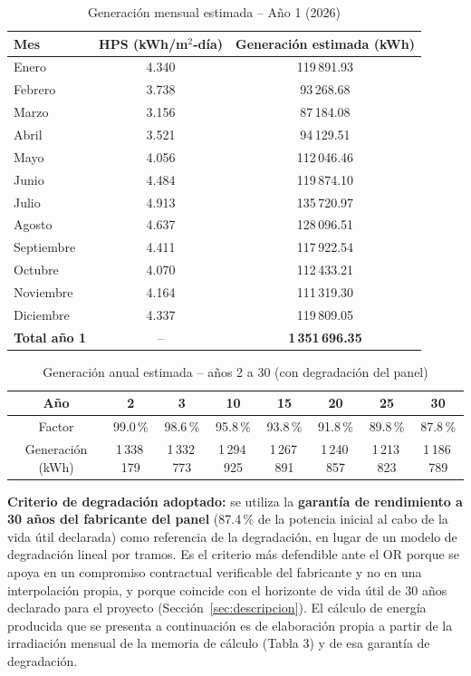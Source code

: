 \documentclass[11pt,a4paper]{article}
\begin{document}
\begin{table}[H]
\centering
\caption{Generaci\'on mensual estimada -- A\~no 1 (2026)}
\begin{tabular}{lcc}
\toprule
Mes & HPS (kWh/m$^2$-d\'ia) & Generaci\'on estimada (kWh) \\
\midrule
Enero & 4.340 & 119\,891.93 \\
Febrero & 3.738 & 93\,268.68 \\
Marzo & 3.156 & 87\,184.08 \\
Abril & 3.521 & 94\,129.51 \\
Mayo & 4.056 & 112\,046.46 \\
Junio & 4.484 & 119\,874.10 \\
Julio & 4.913 & 135\,720.97 \\
Agosto & 4.637 & 128\,096.51 \\
Septiembre & 4.411 & 117\,922.54 \\
Octubre & 4.070 & 112\,433.21 \\
Noviembre & 4.164 & 111\,319.30 \\
Diciembre & 4.337 & 119\,809.05 \\
\midrule
\textbf{Total a\~no 1} & -- & \textbf{1\,351\,696.35} \\
\bottomrule
\end{tabular}
\end{table}

\begin{table}[H]
\centering
\caption{Generaci\'on anual estimada -- a\~nos 2 a 30 (con degradaci\'on del panel)}
\begin{tabular}{cccccccc}
\toprule
A\~no & 2 & 3 & 10 & 15 & 20 & 25 & 30 \\
\midrule
Factor & 99.0\,\% & 98.6\,\% & 95.8\,\% & 93.8\,\% & 91.8\,\% & 89.8\,\% & 87.8\,\% \\
Generaci\'on (kWh) & 1\,338\,179 & 1\,332\,773 & 1\,294\,925 & 1\,267\,891 & 1\,240\,857 & 1\,213\,823 & 1\,186\,789 \\
\bottomrule
\end{tabular}
\end{table}
\textbf{Criterio de degradaci\'on adoptado:} se utiliza la \textbf{garant\'ia de rendimiento a 30 a\~nos del fabricante del panel} (87.4\,\% de la potencia inicial al cabo de la vida \'util declarada) como referencia de la degradaci\'on, en lugar de un modelo de degradaci\'on lineal por tramos. Es el criterio m\'as defendible ante el OR porque se apoya en un compromiso contractual verificable del fabricante y no en una interpolaci\'on propia, y porque coincide con el horizonte de vida \'util de 30 a\~nos declarado para el proyecto (Secci\'on~\ref{sec:descripcion}). El c\'alculo de energ\'ia producida que se presenta a continuaci\'on es de elaboraci\'on propia a partir de la irradiaci\'on mensual de la memoria de c\'alculo (Tabla 3) y de esa garant\'ia de degradaci\'on.
\end{document}
